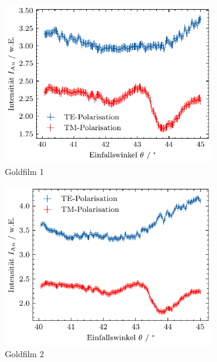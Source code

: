 \begin{figure}[H]
    \centering
    \begin{subfigure}{0.4\textwidth}
        \centering
        \includegraphics[width=\linewidth]{../figs/au1_own}
        \caption{Goldfilm 1}
    \end{subfigure}
    \begin{subfigure}{0.4\textwidth}
        \centering
        \includegraphics[width=\linewidth]{../figs/au2_own}
        \caption{Goldfilm 2}
    \end{subfigure}
    \begin{subfigure}{0.4\textwidth}
        \centering

\end{subfigure}
\end{figure}
